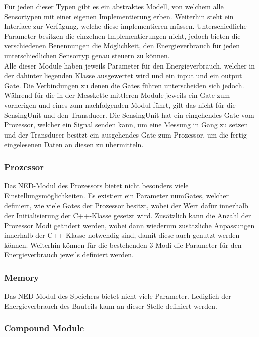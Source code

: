 Für jeden dieser Typen gibt es ein abstraktes Modell, von welchem alle Sensortypen mit einer eigenen Implementierung erben. Weiterhin steht ein Interface zur Verfügung, welche diese implementieren müssen. Unterschiedliche Parameter besitzen die einzelnen Implementierungen nicht, jedoch bieten die verschiedenen Benennungen die Möglichkeit, den Energieverbrauch für jeden unterschiedlichen Sensortyp genau steuern zu können.\\
Alle dieser Module haben jeweils Parameter für den Energieverbrauch, welcher in der dahinter liegenden Klasse ausgewertet wird und ein input und ein output Gate. Die Verbindungen zu denen die Gates führen unterscheiden sich jedoch.\\
Während für die in der Messkette mittleren Module jeweils ein Gate zum vorherigen und eines zum nachfolgenden Modul führt, gilt das nicht für die SensingUnit und den Transducer. Die SensingUnit hat ein eingehendes Gate vom Prozessor, welcher ein Signal senden kann, um eine Messung in Gang zu setzen und der Transducer besitzt ein ausgehendes Gate zum Prozessor, um die fertig eingelesenen Daten an diesen zu übermitteln.

\subsubsection{Prozessor}

Das NED-Modul des Prozessors bietet nicht besonders viele Einstellungsmöglichkeiten. Es existiert ein Parameter numGates, welcher definiert, wie viele Gates der Prozessor besitzt, wobei der Wert dafür innerhalb der Initialisierung der C++-Klasse gesetzt wird. Zusätzlich kann die Anzahl der Prozessor Modi geändert werden, wobei dann wiederum zusätzliche Anpassungen innerhalb der C++-Klasse notwendig sind, damit diese auch genutzt werden können. Weiterhin können für die bestehenden 3 Modi die Parameter für den Energieverbrauch jeweils definiert werden.

\subsubsection{Memory}

Das NED-Modul des Speichers bietet nicht viele Parameter. Lediglich der Energieverbrauch des Bauteils kann an dieser Stelle definiert werden.

\subsubsection{Compound Module}


